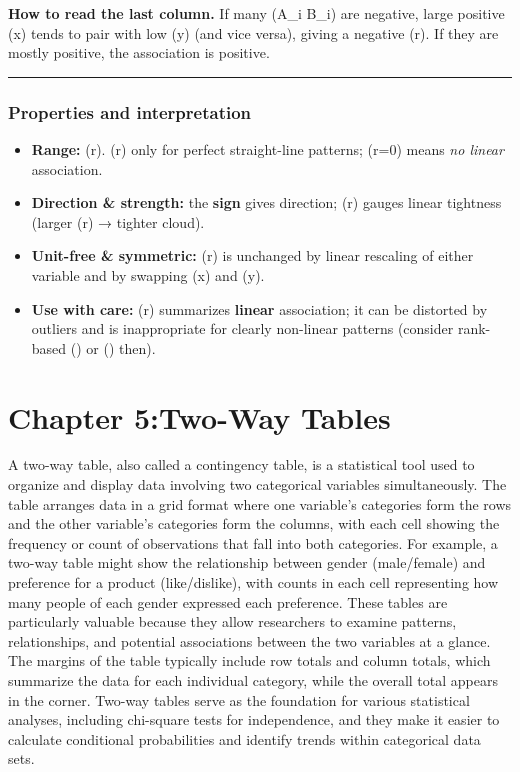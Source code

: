 \documentclass[
  letterpaper,
  DIV=11,
  numbers=noendperiod]{scrreprt}
\providecommand{\tightlist}{%
  \setlength{\itemsep}{0pt}\setlength{\parskip}{0pt}}
\begin{document}
\textbf{How to read the last column.} If many (A\_i B\_i) are negative,
large positive (x) tends to pair with low (y) (and vice versa), giving a
negative (r). If they are mostly positive, the association is positive.

\begin{center}\rule{0.5\linewidth}{0.5pt}\end{center}

\subsection{Properties and
interpretation}\label{properties-and-interpretation}

\begin{itemize}
\tightlist
\item
  \textbf{Range:} (r\in[-1,1]). (\textbar r) only for perfect
  straight-line patterns; (r=0) means \emph{no linear} association.
\item
  \textbf{Direction \& strength:} the \textbf{sign} gives direction;
  (\textbar r\textbar) gauges linear tightness (larger
  (\textbar r\textbar) → tighter cloud).
\item
  \textbf{Unit-free \& symmetric:} (r) is unchanged by linear rescaling
  of either variable and by swapping (x) and (y).
\item
  \textbf{Use with care:} (r) summarizes \textbf{linear} association; it
  can be distorted by outliers and is inappropriate for clearly
  non-linear patterns (consider rank-based (\rho) or (\tau) then).
\end{itemize}


\chapter{Chapter 5:Two-Way Tables}\label{chapter-5two-way-tables}

A two-way table, also called a contingency table, is a statistical tool
used to organize and display data involving two categorical variables
simultaneously. The table arranges data in a grid format where one
variable's categories form the rows and the other variable's categories
form the columns, with each cell showing the frequency or count of
observations that fall into both categories. For example, a two-way
table might show the relationship between gender (male/female) and
preference for a product (like/dislike), with counts in each cell
representing how many people of each gender expressed each preference.
These tables are particularly valuable because they allow researchers to
examine patterns, relationships, and potential associations between the
two variables at a glance. The margins of the table typically include
row totals and column totals, which summarize the data for each
individual category, while the overall total appears in the corner.
Two-way tables serve as the foundation for various statistical analyses,
including chi-square tests for independence, and they make it easier to
calculate conditional probabilities and identify trends within
categorical data sets.
\end{document}
